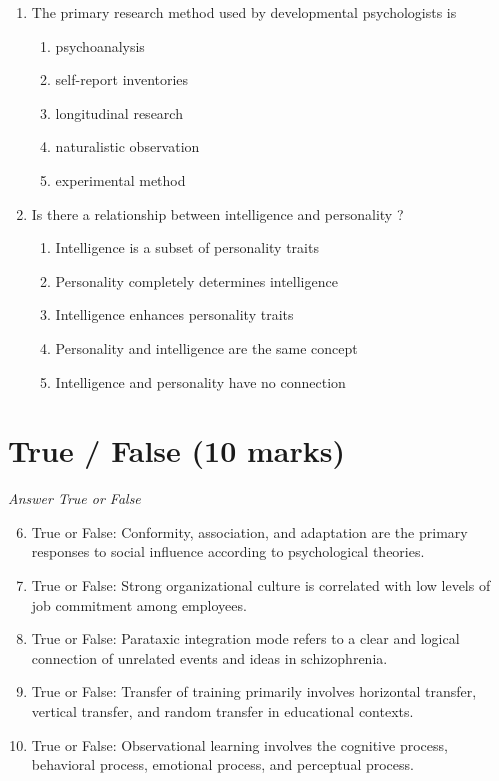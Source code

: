 \documentclass[12pt]{article}
\begin{document}
\begin{enumerate}[label=\arabic*.]
\begin{enumerate}[label=(\alph*)]
\end{enumerate}
\item The primary research method used by developmental psychologists is
\begin{enumerate}[label=(\alph*)]
    \item psychoanalysis
    \item self-report inventories
    \item longitudinal research
    \item naturalistic observation
    \item experimental method
\end{enumerate}
\item Is there a relationship between intelligence and personality ?
\begin{enumerate}[label=(\alph*)]
    \item Intelligence is a subset of personality traits
    \item Personality completely determines intelligence
    \item Intelligence enhances personality traits
    \item Personality and intelligence are the same concept
    \item Intelligence and personality have no connection
\end{enumerate}
\end{enumerate}

\section*{True / False (10 marks)}
\textit{Answer True or False}
\begin{enumerate}[label=\arabic*.]
\setcounter{enumi}{5}
\item True or False: Conformity, association, and adaptation are the primary responses to social influence according to psychological theories.
\item True or False: Strong organizational culture is correlated with low levels of job commitment among employees.
\item True or False: Parataxic integration mode refers to a clear and logical connection of unrelated events and ideas in schizophrenia.
\item True or False: Transfer of training primarily involves horizontal transfer, vertical transfer, and random transfer in educational contexts.
\item True or False: Observational learning involves the cognitive process, behavioral process, emotional process, and perceptual process.
\end{enumerate}
\end{document}
